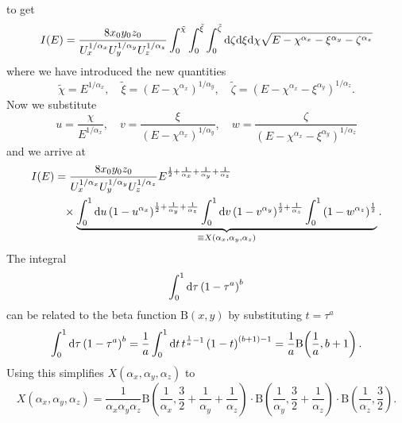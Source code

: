 to get
\begin{equation*}
    I(E) = \frac{8 x_0 y_0 z_0}{U_x^{1/\alpha_x} U_y^{1/\alpha_y} U_z^{1/\alpha_z}} \int_0^{\tilde{\chi}} \int_0^{\tilde{\xi}} \int_0^{\tilde{\zeta}} \text{d}\zeta \text{d}\xi \text{d}\chi \sqrt{E - \chi^{\alpha_x} - \xi^{\alpha_y} - \zeta^{\alpha_z}}
\end{equation*}
where we have introduced the new quantities
\begin{equation*}
    \tilde{\chi} = E^{1/\alpha_x}, \quad \tilde{\xi} = \left(E - \chi^{\alpha_x}\right)^{1/\alpha_y}, \quad \tilde{\zeta} = \left(E - \chi^{\alpha_x} - \xi^{\alpha_y}\right)^{1/\alpha_z}.
\end{equation*}
Now we substitute
\begin{equation*}
    u = \frac{\chi}{E^{1/\alpha_x}}, \quad v = \frac{\xi}{\left(E - \chi^{\alpha_x}\right)^{1/\alpha_y}}, \quad w = \frac{\zeta}{\left(E - \chi^{\alpha_x} - \xi^{\alpha_y}\right)^{1/\alpha_z}}
\end{equation*}
and we arrive at
\begin{align*}
    I(E) &= \frac{8 x_0 y_0 z_0}{U_x^{1/\alpha_x} U_y^{1/\alpha_y} U_z^{1/\alpha_z}} E^{\frac{1}{2} + \frac{1}{\alpha_x} + \frac{1}{\alpha_y} + \frac{1}{\alpha_z}} \\
    &\phantom{=} \times \underbrace{\int_0^1 \text{d}u \left(1 - u^{\alpha_x}\right)^{\frac{1}{2} + \frac{1}{\alpha_y} + \frac{1}{\alpha_z}} \int_0^1 \text{d}v \left(1 - v^{\alpha_y}\right)^{\frac{1}{2} + \frac{1}{\alpha_z}} \int_0^1 \left(1 - w^{\alpha_z}\right)^\frac{1}{2}}_{\equiv X(\alpha_x,\alpha_y,\alpha_z)}.
\end{align*}
The integral
\[
    \int_0^1 \text{d}\tau \left(1 - \tau^a\right)^b 
\]
can be related to the beta function $\text{B}(x,y)$ \cite[Eq.~5.12.1]{NIST:DLMF} by substituting $t = \tau^a$
\begin{equation*}
    \int_0^1 \text{d}\tau \left(1 - \tau^a\right)^b = \frac{1}{a} \int_0^1 \text{d}t\, t^{\frac{1}{a} - 1} \left(1 - t\right)^{(b + 1) - 1} =\frac{1}{a} \text{B}\!\left(\frac{1}{a}, b + 1\right).
\end{equation*}
Using this simplifies $X(\alpha_x,\alpha_y,\alpha_z)$ to 
\begin{equation*}
    X(\alpha_x,\alpha_y,\alpha_z) = \frac{1}{\alpha_x \alpha_y \alpha_z} \text{B}\!\left(\frac{1}{\alpha_x}, \frac{3}{2} + \frac{1}{\alpha_y} + \frac{1}{\alpha_z} \right) \cdot \text{B}\!\left(\frac{1}{\alpha_y}, \frac{3}{2} + \frac{1}{\alpha_z} \right) \cdot \text{B}\!\left(\frac{1}{\alpha_z}, \frac{3}{2}\right).
\end{equation*}
